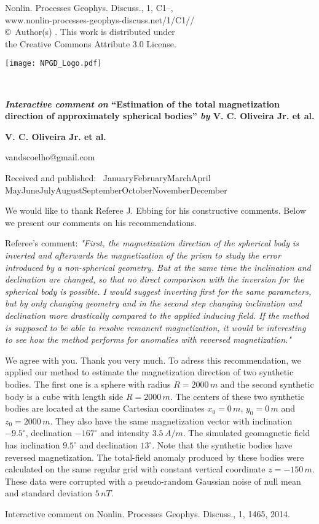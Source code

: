 \documentclass[11pt]{article}
\def\firstpage{1}
\renewcommand\today{\number\day~\ifcase\month\or January\or February\or March\or April\or
   May\or June\or July\or August\or September\or October\or November\or December\fi~\number\year}
\let\bf\bfseries %
\let\it\slshape  %
\def\npgdlogo{%
   \parbox[t]{45.5mm}{\vskip-2.5mm\texttt{[image: NPGD\_Logo.pdf]}\\[-2.1mm] \null\hfill}}
\def\npgdref{\fontencoding{T1}\fontfamily{phv}\fontseries{m}\fontshape{n}\fontsize{8}{11}\selectfont
Nonlin. Processes Geophys. Discuss., 1,
   C\firstpage--\pageref*{LastPage}, \number\year} %
\def\npgdurl{www.nonlin-processes-geophys-discuss.net/1/C\firstpage/\number\year} %
\def\thetitle{{\slshape Interactive comment on}
  ``Estimation of the total magnetization direction of approximately spherical bodies'' {\slshape by} V. C. Oliveira Jr. et al.}
\begin{document}
\sffamily
\noindent\parbox[t]{9.9cm}{\npgdref\\\npgdurl/\\
\copyright\ Author(s) \number\year. This work is distributed under\\the Creative Commons Attribute 3.0 License.}
\hfill\npgdlogo\\[20mm]
{\raggedright\LARGE\bfseries\thetitle\\[5mm]}
{\raggedright\bfseries V. C. Oliveira Jr. et al.\\[3mm]}
{\raggedright\small vandscoelho@gmail.com\\[3mm]}
{\raggedright\small Received and published: \today\\[7mm]}
We would like to thank Referee J. Ebbing for his constructive comments. Below we present our comments on his recommendations.

\noindent{\bf General comments}

Referee's comment: {\it "First, the magnetization direction of the spherical body is inverted and afterwards the magnetization of the prism to study the error introduced by a non-spherical geometry. But at the same time the inclination and declination are changed, so that no direct comparison with the inversion for the spherical body is possible. I would suggest inverting first for the same parameters, but by only changing geometry and in the second step changing inclination and declination more drastically compared to the applied inducing field. If the method is supposed to be able to resolve remanent magnetization, it would be interesting to see how the method performs for anomalies with reversed magnetization."}

We agree with you. Thank you very much. To adress this recommendation, we applied our method to estimate the magnetization direction of two synthetic bodies. The first one is a sphere with radius $R = 2000 \, m$ and the second synthetic body is a cube with length side $R = 2000 \, m$. The centers of these two synthetic bodies are located at the same Cartesian coordinates $x_{0} = 0 \, m$, $y_{0} = 0 \, m$ and $z_{0} = 2000 \, m$. They also have the same magnetization vector with inclination $-9.5^{\circ}$, declination $-167^{\circ}$ and intensity $3.5 \, A/m$. The simulated geomagnetic field has inclination $9.5^{\circ}$ and declination $13^{\circ}$. Note that the synthetic bodies have reversed magnetization. The total-field anomaly produced by these bodies were calculated on the same regular grid with constant vertical coordinate $z = -150 \, m$. These data were corrupted with a pseudo-random Gaussian noise of null mean and standard deviation $5 \, nT$. 

\noindent{\bf Specific comments}


\bigskip\footnoterule

{\small Interactive comment on Nonlin. Processes Geophys. Discuss., 1, 1465, 2014.}
\end{document}
